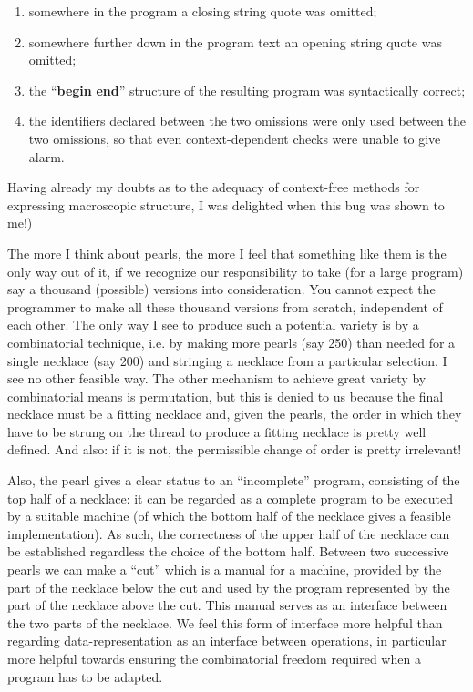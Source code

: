 \begin{enumerate}[wide, nosep, label=(\arabic*)]
	\item somewhere in the program a closing string quote was omitted;
	
	\item somewhere further down in the program text an opening string quote was omitted;
	
	\item the ``\textbf{begin} \textendash  \textbf{end}'' structure of the resulting program was syntactically correct;
	
	\item the identifiers declared between the two omissions were only used 	between the two omissions, so that even context-dependent checks were 	unable to give alarm.
\end{enumerate}

\noindent
Having already my doubts as to the adequacy of context-free methods for expressing macroscopic structure, I was delighted when this bug was shown to me!)

The more I think about pearls, the more I feel that something like them is the only way out of it, if we recognize our responsibility to take (for a large program) say a thousand (possible) versions into consideration. You cannot expect the programmer to make all these thousand versions from scratch, independent of each other. The only way I see to produce such a potential variety is by a combinatorial technique, i.e. by making more pearls (say 250) than needed for a single necklace (say 200) and stringing a necklace from a particular selection. I see no other feasible way. The other mechanism to achieve great variety by combinatorial means is permutation, but this is denied to us because the final necklace must be a fitting necklace and, given the pearls, the order in which they have to be strung on the thread to produce a fitting necklace is pretty well defined. And also: if it is not, the permissible change of order is pretty irrelevant!

Also, the pearl gives a clear status to an ``incomplete'' program, consisting of the top half of a necklace: it can be regarded as a complete program to be executed by a suitable machine (of which the bottom half of the necklace gives a feasible implementation). As such, the correctness of the upper half of the necklace can be established regardless the choice of the bottom half. Between two successive pearls we can make a ``cut'' which is a manual for a machine, provided by the part of the necklace below the cut and used by the program represented by the part of the necklace above the cut. This manual serves as an interface between the two parts of the necklace. We feel this form of interface more helpful than regarding data-representation as an interface between operations, in particular more helpful towards ensuring the combinatorial freedom required when a program has to be adapted.

